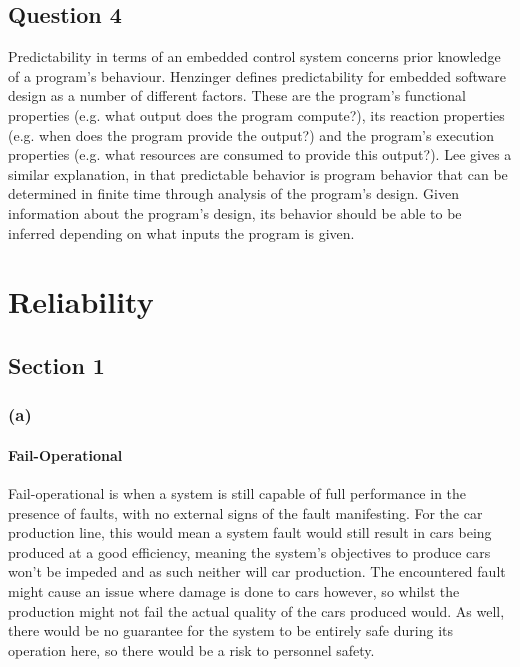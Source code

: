 \documentclass[]{report}
\begin{document}
		\section{Question 4}
		Predictability in terms of an embedded control system concerns prior knowledge of a program's behaviour. Henzinger\cite{henzinger2008two} defines predictability for embedded software design as a number of different factors. These are the program's functional properties (e.g. what output does the program compute?), its reaction properties (e.g. when does the program provide the output?) and the program's execution properties (e.g. what resources are consumed to provide this output?). Lee\cite{Lee:EECS-2009-30} gives a similar explanation, in that predictable behavior is program behavior that can be determined in finite time through analysis of the program's design. Given information about the program's design, its behavior should be able to be inferred depending on what inputs the program is given.
		\medskip
		
		
		
	
	
	\chapter{Reliability}
		\section{Section 1}
			\subsection{(a)}
				\subsubsection{Fail-Operational}
				Fail-operational is when a system is still capable of full performance in the presence of faults, with no external signs of the fault manifesting. For the car production line, this would mean a system fault would still result in cars being produced at a good efficiency, meaning the system's objectives to produce cars won't be impeded and as such neither will car production. The encountered fault might cause an issue where damage is done to cars however, so whilst the production might not fail the actual quality of the cars produced would. As well, there would be no guarantee for the system to be entirely safe during its operation here, so there would be a risk to personnel safety.
				
\end{document}
